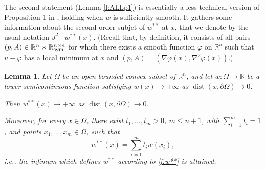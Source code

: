 \documentclass[11pt]{amsart}
\newtheorem{lemma}[theorem]{Lemma}
\theoremstyle{definition}
\theoremstyle{remark}
\def\R{\mathbb{R}}
\def\subjet{J^{2,-}}
\DeclareMathOperator{\dist}{dist}
\begin{document}
\smallskip
The second statement (Lemma \ref{l:ALLp1}) is essentially a less technical version of Proposition  1 in \cite{ALL}, 
holding when $w$ is sufficiently smooth.   It
gathers some information about the second order subjet of $w ^ {**} $  at $x$, 
that we  denote by the usual notation $\subjet w^{**}(x)$. (Recall that, by definition,  it consists of all pairs 
$( p, A) \in \R ^n \times \R ^ { n\times n} _{{\rm sym}} $ for which there exists a smooth function $\varphi$ on $\R ^n$ 
such that $u - \varphi$ has a local minimum at $x$ and $(p, A) = (\nabla \varphi (x), \nabla ^ 2 \varphi (x))$.) 




\begin{lemma}
\label{l:bdr}
Let $\Omega$ be an open bounded convex subset of $\R^n$,  and 
let $w\colon\Omega\to\R$ be a lower semicontinuous function
satisfying
$w(x) \to +\infty$ as $\dist(x, \partial\Omega) \to 0$.

Then $w^{**}(x) \to +\infty$ 
as $\dist(x, \partial\Omega) \to 0$.

Moreover, for every $x\in\Omega$, there exist
$t_1, \ldots, t_m > 0$, $m\leq n+1$, with $\sum_{i=1}^m t_i = 1$,
and points $x_1, \ldots, x_m \in \Omega$, such that 
\begin{equation}
\label{f:min}
w^{**}(x) = \sum_{i=1}^m t_i w(x_i),
\end{equation}
i.e., the infimum which defines $w ^ {**}$ according to \eqref{f:w**} is attained.
\end{lemma}
\end{document}
